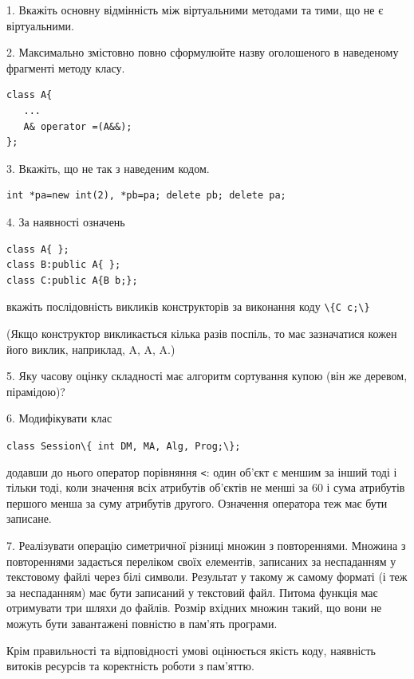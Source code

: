 \documentclass[12pt, ukrainian]{article}
\def\code#1{\Verb!#1!}
\begin{document}
{%
1. Вкажіть основну відмінність між віртуальними методами та тими, що не є віртуальними.%
\par
\vspace{2mm}
2. Максимально змістовно повно сформулюйте назву оголошеного в наведеному фрагменті методу класу.
\vspace{-3mm}
\begin{verbatim}class A{
   ...
   A& operator =(A&&);
};\end{verbatim}
\vspace{-3mm}
\par
\vspace{2mm}
3. Вкажіть, що не так з наведеним кодом.
\vspace{-3mm}
\begin{verbatim}int *pa=new int(2), *pb=pa; delete pb; delete pa;\end{verbatim}
\vspace{-3mm}
\par
\vspace{2mm}
4. За наявності означень
\vspace{-3mm}
\begin{verbatim}
class A{ };
class B:public A{ };
class C:public A{B b;};\end{verbatim}
\vspace{-3mm}
вкажіть послідовність викликів конструкторів за виконання коду \code{\{C c;\}} 

(Якщо конструктор викликається кілька разів поспіль, то має зазначатися кожен його виклик, наприклад, A, A, A.)

\vspace{2mm}
5. Яку часову оцінку складності має алгоритм сортування купою (він же деревом, пірамідою)?
\par
\vspace{2mm}
6. Модифікувати клас 

\qquad\code{class Session\{ int DM, MA, Alg, Prog;\};} 


додавши до нього оператор порівняння \code{<}: один об'єкт є меншим за інший тоді і тільки тоді, коли значення всіх атрибутів об'єктів не менші за 60 і сума атрибутів першого менша за суму атрибутів другого. Означення оператора теж має бути записане.%
\par
\vspace{2mm}
7. 
Реалізувати операцію симетричної різниці множин з повтореннями. Множина з повтореннями задається переліком своїх елементів, записаних за неспаданням у текстовому файлі через білі символи. Результат у такому ж самому форматі (і теж за неспаданням) має бути записаний у текстовий файл. Питома функція має отримувати три шляхи до файлів. Розмір вхідних множин такий, що вони не можуть бути завантажені повністю в пам’ять програми.

Крім правильності та відповідності умові оцінюється якість коду, наявність витоків ресурсів та коректність роботи з пам'яттю. 

}
\end{document}
